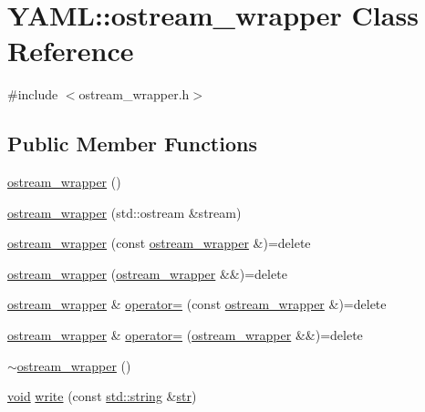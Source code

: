 \hypertarget{class_y_a_m_l_1_1ostream__wrapper}{}\section{Y\+A\+ML\+::ostream\+\_\+wrapper Class Reference}
\label{class_y_a_m_l_1_1ostream__wrapper}


{\ttfamily \#include $<$ostream\+\_\+wrapper.\+h$>$}

\subsection*{Public Member Functions}
\begin{DoxyCompactItemize}
\item 
\mbox{\hyperlink{class_y_a_m_l_1_1ostream__wrapper_abfe741e8f4d60c66bf30589df9738e9f}{ostream\+\_\+wrapper}} ()
\item 
\mbox{\hyperlink{class_y_a_m_l_1_1ostream__wrapper_a6f5b667be5fa28823b8b70a00a72239a}{ostream\+\_\+wrapper}} (std\+::ostream \&stream)
\item 
\mbox{\hyperlink{class_y_a_m_l_1_1ostream__wrapper_a989b6e18be010c1044afd3b9d9c42527}{ostream\+\_\+wrapper}} (const \mbox{\hyperlink{class_y_a_m_l_1_1ostream__wrapper}{ostream\+\_\+wrapper}} \&)=delete
\item 
\mbox{\hyperlink{class_y_a_m_l_1_1ostream__wrapper_aa576aaf1c82781cc1fb67822a0983268}{ostream\+\_\+wrapper}} (\mbox{\hyperlink{class_y_a_m_l_1_1ostream__wrapper}{ostream\+\_\+wrapper}} \&\&)=delete
\item 
\mbox{\hyperlink{class_y_a_m_l_1_1ostream__wrapper}{ostream\+\_\+wrapper}} \& \mbox{\hyperlink{class_y_a_m_l_1_1ostream__wrapper_affb4d100939be0c8e2e883c680d45382}{operator=}} (const \mbox{\hyperlink{class_y_a_m_l_1_1ostream__wrapper}{ostream\+\_\+wrapper}} \&)=delete
\item 
\mbox{\hyperlink{class_y_a_m_l_1_1ostream__wrapper}{ostream\+\_\+wrapper}} \& \mbox{\hyperlink{class_y_a_m_l_1_1ostream__wrapper_a085cfa4a7970136b8f1d11913964bf18}{operator=}} (\mbox{\hyperlink{class_y_a_m_l_1_1ostream__wrapper}{ostream\+\_\+wrapper}} \&\&)=delete
\item 
\mbox{\hyperlink{class_y_a_m_l_1_1ostream__wrapper_ab4d0c630394c7062c85bb44e052feb18}{$\sim$ostream\+\_\+wrapper}} ()
\item 
\mbox{\hyperlink{glad_8h_a950fc91edb4504f62f1c577bf4727c29}{void}} \mbox{\hyperlink{class_y_a_m_l_1_1ostream__wrapper_a9530c6507de27dce5dde5324b64a7b81}{write}} (const \mbox{\hyperlink{glad_8h_ac83513893df92266f79a515488701770}{std\+::string}} \&\mbox{\hyperlink{class_y_a_m_l_1_1ostream__wrapper_a582c854b4d9abc7344b17f2fa91575c2}{str}})

\end{DoxyCompactItemize}
